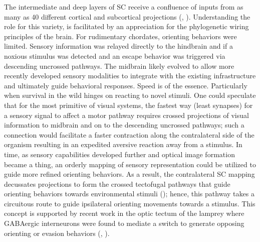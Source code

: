 \documentclass{ar-1col}
\begin{document}
The intermediate and deep layers of SC receive a confluence of inputs from as many as 40 different cortical and subcortical projections (\cite{edwards1979sources}, \cite{huerta1984connectional}). Understanding the role for this variety, is facilitated by an appreciation for the phylogenetic wiring principles of the brain. For rudimentary chordates, orienting behaviors were limited. Sensory information was relayed directly to the hindbrain and if a noxious stimulus was detected and an escape behavior was triggered via descending uncrossed pathways. The midbrain likely evolved to allow more recently developed sensory modalities to integrate with the existing infrastructure and ultimately guide behavioral responses. Speed is of the essence. Particularly when survival in the wild hinges on reacting to novel stimuli. One could speculate that for the most primitive of visual systems, the fastest way (least synapses) for a sensory signal to affect a motor pathway requires crossed projections of visual information to midbrain and on to the descending uncrossed pathways; such a connection would facilitate a faster contraction along the contralateral side of the organism resulting in an expedited aversive reaction away from a stimulus. In time, as sensory capabilities developed further and optical image formation became a thing, an orderly mapping of sensory representation could be utilized to guide more refined orienting behaviors. As a result, the contralateral SC mapping decussates projections to form the crossed tectofugal pathways that guide orienting behaviors towards environmental stimuli (\cite{schneider2014brain}); hence, this pathway takes a circuitous route to guide ipsilateral orienting movements towards a stimulus. This concept is supported by recent work in the optic tectum of the lamprey where GABAergic interneurons were found to mediate a switch to generate opposing orienting or evasion behaviors (\cite{saitoh2007tectal}, \cite{suzuki2019role}).
\end{document}

